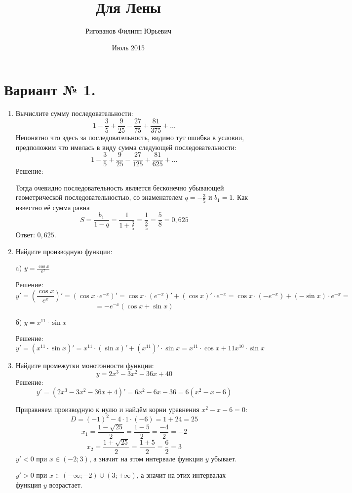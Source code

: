 \documentclass{article}
\title{Для Лены}
\author{Ригованов Филипп Юрьевич}
\date{Июль 2015}
\begin{document}
\maketitle
\section*{Вариант № 1.}
\begin{enumerate}

\item %
Вычислите сумму последовательности:
$$1-\frac{3}{5}+\frac{9}{25}-\frac{27}{75}+\frac{81}{375}+\ldots$$
Непонятно что здесь за последовательность, видимо тут ошибка в условии, предположим что имелась в виду сумма следующей последовательности:
$$1-\frac{3}{5}+\frac{9}{25}-\frac{27}{125}+\frac{81}{625}+\ldots$$
Решение:

Тогда очевидно последовательность является бесконечно убывающей геометрической последовательностью, со знаменателем $q=-\frac{3}{5}$ и $b_1=1$. Как известно её сумма равна $$S=\frac{b_1}{1-q}=\frac{1}{1+\frac{3}{5}}=\frac{1}{\frac{8}{5}}=\frac{5}{8}=0,625$$
Ответ: $0,625$.

\item %
Найдите производную функции:

a) $y=\frac{\cos{x}}{e^x}$

Решение:
$$y'=\left(\frac{\cos{x}}{e^x}\right)'=\left(\cos{x}\cdot e^{-x}\right)'=\cos{x}\cdot\left(e^{-x}\right)'+\left(\cos{x}\right)'\cdot e^{-x}=\cos{x}\cdot\left(-e^{-x}\right)+\left(-\sin{x}\right)\cdot e^{-x}=$$ $$=-e^{-x}\left(\cos{x}+\sin{x}\right)$$

б) $y=x^{11}\cdot\sin{x}$

Решение:
$$y'=\left(x^{11}\cdot\sin{x}\right)'=x^{11}\cdot\left(\sin{x}\right)'+\left(x^{11}\right)'\cdot\sin{x}=x^{11}\cdot\cos{x}+11x^{10}\cdot\sin{x}$$

\item %
Найдите промежутки монотонности функции:
$$y=2x^3-3x^2-36x+40$$
Решение:
$$y'=\left(2x^3-3x^2-36x+4\right)'=6x^2-6x-36=6\left(x^2-x-6\right)$$ %

Приравняем производную к нулю и найдём корни уравнения $x^2-x-6=0$:
$$D=(-1)^2-4\cdot1\cdot(-6)=1+24=25$$
$$x_1=\frac{1-\sqrt{25}}{2}=\frac{1-5}{2}=\frac{-4}{2}=-2$$
$$x_2=\frac{1+\sqrt{25}}{2}=\frac{1+5}{2}=\frac{6}{2}=3$$
$y'<0$ при $x\in\left(-2;3\right)$, а значит на этом интервале функция $y$ убывает.

$y'>0$ при $x\in\left(-\infty;-2\right)\cup\left(3;+\infty\right)$, а значит на этих интервалах функция $y$ возрастает.


\end{enumerate}
\end{document}
